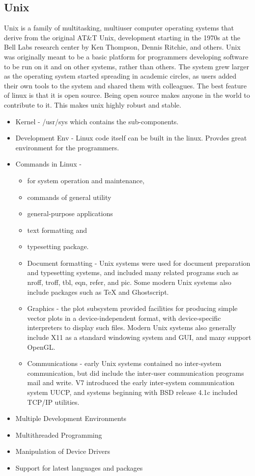 \subsection{Unix}
Unix is a family of multitasking, multiuser computer operating systems that derive from the original AT\&T Unix, development starting in the 1970s at the Bell Labs research center by Ken Thompson, Dennis Ritchie, and others.
Unix was originally meant to be a basic platform for programmers developing software to be run on it and on other systems, rather than others. The system grew larger as the operating system started spreading in academic circles, as users added their own tools to the system and shared them with colleagues. The best feature of linux is that it is open source. Being open source makes anyone in the world to contribute to it. This makes unix highly robust and stable.  
\begin{itemize}
	\item Kernel - /usr/sys which contains the sub-components.
	\item Development Env - Linux code itself can be built in the linux. Provdes great environment for the programmers.
	\item Commands in Linux - \begin{itemize}
	\item  for system operation and maintenance, \item commands of general utility\item general-purpose applications  \item text formatting and \item typesetting package. 
	\item Document formatting - Unix systems were used  for document preparation and typesetting systems, and included many related programs such as nroff, troff, tbl, eqn, refer, and pic. Some modern Unix systems also include packages such as TeX and Ghostscript.
	\item Graphics - the plot subsystem provided facilities for producing simple vector plots in a device-independent format, with device-specific interpreters to display such files. Modern Unix systems also generally include X11 as a standard windowing system and GUI, and many support OpenGL.
	\item Communications - early Unix systems contained no inter-system communication, but did include the inter-user communication programs mail and write. V7 introduced the early inter-system communication system UUCP, and systems beginning with BSD release 4.1c included TCP/IP utilities.
\end{itemize}
\item Multiple Development Environments
\item Multithreaded Programming
\item Manipulation of Device Drivers
\item Support for latest languages and packages
\end{itemize}
